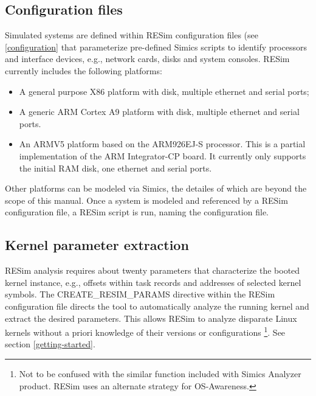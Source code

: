 \documentclass[titlepage]{article}
\begin{document}
\subsection{Configuration files}
Simulated systems are defined within RESim configuration files (see \ref{configuration} that  parameterize pre-defined Simics scripts to identify 
processors and interface devices, e.g., network cards, disks and system consoles.  RESim currently includes the following platforms: 
\begin{itemize}
\item A general purpose X86 platform with disk, multiple ethernet and serial ports;
\item A generic ARM Cortex A9 platform with disk, multiple ethernet and serial ports.
\item An ARMV5 platform based on the ARM926EJ-S processor.  This is a partial implementation of the ARM Integrator-CP board.  It currently only supports
the initial RAM disk, one ethernet and serial ports.
\end{itemize}

Other platforms can be modeled via Simics, the detailes of which are beyond the scope of this manual.
Once a system is modeled and referenced by a RESim configuration file, a RESim script is run, naming the configuration file.

\subsection{Kernel parameter extraction}
RESim analysis requires about twenty parameters that characterize the booted kernel instance, e.g., offsets within task 
records and addresses of selected kernel symbols.  The CREATE\_RESIM\_PARAMS directive within the RESim configuration file directs the tool to automatically analyze the running kernel 
and extract the desired parameters.  This allows RESim to analyze disparate Linux kernels without a priori 
knowledge of their versions or configurations \footnote{Not to be confused with the similar function included with Simics Analyzer product. RESim uses an alternate strategy for OS-Awareness.}.
See section \ref{getting-started}.
\end{document}
